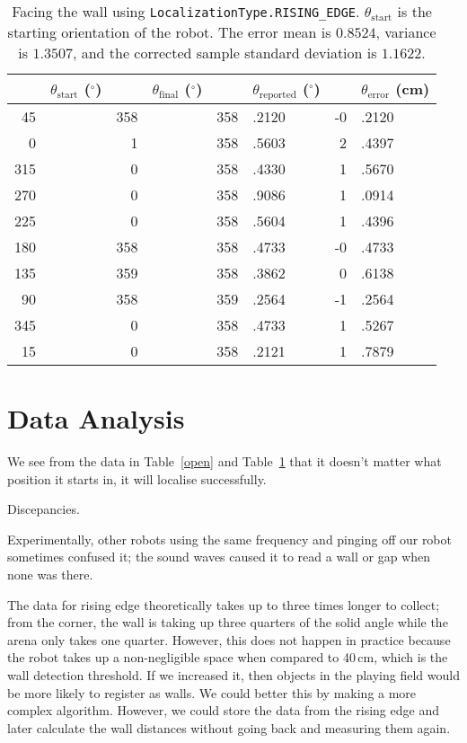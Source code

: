 \documentclass[twocolumn]{article}
\def\degree{\ensuremath{^\circ}}
\begin{document}
\begin{table*}[htb]
\begin{center}\begin{tabular}{r@{}l r@{}l r@{}l r@{}l}
&$\theta_{\text{start}}$ (\degree)& &$\theta_{\text{final}}$ (\degree)& &$\theta_{\text{reported}}$ (\degree)& &$\theta_{\text{error}}$ (cm) \\
\hline
45&& 358&& 358&.2120& -0&.2120 \\
0&& 1&& 358&.5603& 2&.4397 \\
315&& 0&& 358&.4330& 1&.5670 \\
270&& 0&& 358&.9086& 1&.0914 \\
225&& 0&& 358&.5604& 1&.4396 \\
180&& 358&& 358&.4733& -0&.4733 \\
135&& 359&& 358&.3862& 0&.6138 \\
90&& 358&& 359&.2564& -1&.2564 \\
345&& 0&& 358&.4733& 1&.5267 \\
15&& 0&& 358&.2121& 1&.7879 \\
\end{tabular}\end{center}
\caption{Facing the wall using {\tt LocalizationType.RISING\_EDGE}.
$\theta_{\text{start}}$ is the starting orientation of the robot.
The error mean is $0.8524$, variance is $1.3507$, and the corrected sample standard deviation is $1.1622$.}
\label{wall}
\end{table*}

\section{Data Analysis}

We see from the data in Table~\ref{open} and Table~\ref{wall} that it doesn't matter what position it starts in, it will localise successfully.

Discepancies.

Experimentally, other robots using the same frequency and pinging off our robot sometimes confused it; the sound waves caused it to read a wall or gap when none was there.

The data for rising edge theoretically takes up to three times longer to collect; from the corner, the wall is taking up three quarters of the solid angle while the arena only takes one quarter. However, this does not happen in practice because the robot takes up a non-negligible space when compared to 40\,cm, which is the wall detection threshold. If we increased it, then objects in the playing field would be more likely to register as walls. We could better this by making a more complex algorithm. However, we could store the data from the rising edge and later calculate the wall distances without going back and measuring them again.
\end{document}
